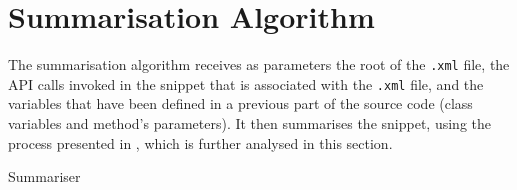 \section{Summarisation Algorithm}
\label{subsec:summarisation-algorithm}

The summarisation algorithm receives as parameters the root of the \texttt{.xml} file, the API calls invoked in the snippet that is associated with the \texttt{.xml} file, and the variables that have been defined in a previous part of the source code (class variables and method's parameters). It then summarises the snippet, using the process presented in , which is further analysed in this section.

\begin{algorithm}
\small
\caption[Summariser]{Summariser}
\label{algorithms:summarisation-algorithm}

\end{algorithm}

